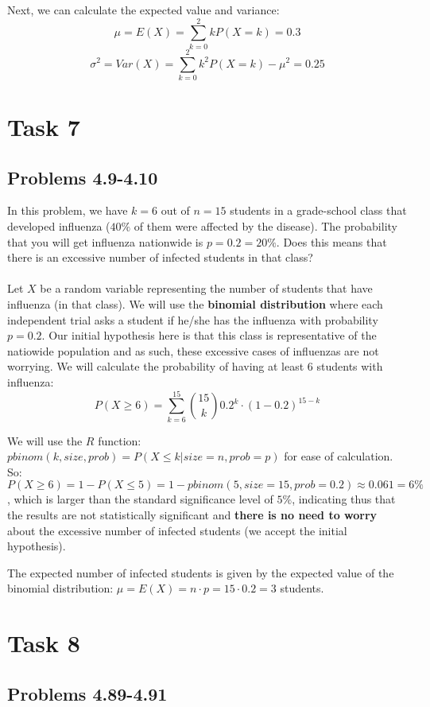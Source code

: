 \documentclass[12pt,a4paper]{article}
\begin{document}
Next, we can calculate the expected value and variance:
$$\mu=E(X)=\sum_{k=0}^2 k P(X=k)=0.3$$
$$\sigma^2=Var(X)=\sum_{k=0}^2 k^2 P(X=k) - \mu^2=0.25$$

\section*{Task 7}

\subsection*{Problems 4.9-4.10}
In this problem, we have $k=6$ out of $n=15$ students in a grade-school class that developed influenza ($40\%$ of them were affected by the disease). The probability that you will get influenza nationwide is $p=0.2=20\%$. Does this means that there is an excessive number of infected students in that class? \\\\
Let $X$ be a random variable representing the number of students that have influenza (in that class). We will use the \textbf{binomial distribution} where each independent trial asks a student if he/she has the influenza with probability $p=0.2$. Our initial hypothesis here is that this class is representative of the natiowide population and as such, these excessive cases of influenzas are not worrying. We will calculate the probability of having at least 6 students with influenza: 
$$P(X\geq 6)=\sum_{k=6}^{15} {15 \choose k}0.2^k\cdot (1-0.2)^{15-k}$$

We will use the $R$ function: $pbinom(k, size, prob) = P(X\leq k|size=n, prob=p)$ for ease of calculation. So: $P(X\geq 6)=1-P(X\leq 5)=1-pbinom(5, size=15, prob=0.2)\approx 0.061=6\%$, which is larger than the standard significance level of $5\%$, indicating thus that the results are not statistically significant and  \textbf{there is no need to worry} about the excessive number of infected students (we accept the initial hypothesis). 

The expected number of infected students is given by the expected value of the binomial distribution: $\mu=E(X)=n\cdot p=15\cdot 0.2=3$ students.

\section*{Task 8}

\subsection*{Problems 4.89-4.91}
\end{document}
